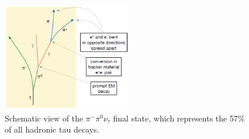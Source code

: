 \begin{figure}[ht]
  \begin{center}
    \includegraphics[width=0.5\textwidth]{figuras/Chapter3/taudecays2.png}
    \caption{Schematic view of the $\pi^{-}\pi^{0}\nu_{\tau}$ final state, which represents the 57$\%$ of all hadronic tau decays.}
    \label{fig:taudecays2}
  \end{center}
\end{figure} 

